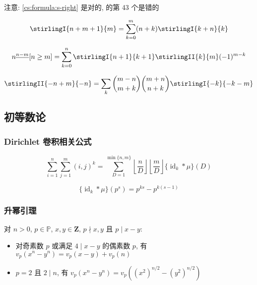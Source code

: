 注意: \eqref{cs:formula:s-right} 是对的,  的第 43 个是错的

\begin{equation}
    \label{cs:formula:s-right}
    \stirlingI{n+m+1}{m}=\sum_{k=0}^m(n+k)\stirlingI{k+n}{k}
\end{equation}

\begin{equation}
    n^{\underline{n-m}}[n\geq m]=\sum_{k=0}^n\stirlingI{n+1}{k+1}\stirlingII{k}{m}(-1)^{m-k}
\end{equation}

\begin{equation}
    \stirlingII{-n+m}{-n}=\sum_k\binom{m-n}{m+k}\binom{m+n}{n+k}\stirlingI{-k}{-k-m}
\end{equation}

\subsection{初等数论}

\subsubsection{Dirichlet 卷积相关公式}

\begin{equation}
    \sum_{i=1}^n\sum_{j=1}^m(i,j)^k=\sum_{D=1}^{\min\{n,m\}}\left\lfloor\frac{n}{D}\right\rfloor\left\lfloor\frac{m}{D}\right\rfloor\{\operatorname{id}_k*\mu\}(D)
\end{equation}

\begin{equation}
    \{\operatorname{id}_k*\mu\}(p^s)=p^{ks}-p^{k(s-1)}
\end{equation}

\subsubsection{升幂引理}

对 \(n>0\), \(p\in\mathbb{P}\), \(x,y\in\mathbf{Z}\), \(p\nmid x,y\) 且 \(p\mid x-y\):

\begin{itemize}
    \item 对奇素数 \(p\) 或满足 \(4\mid x-y\) 的偶素数 \(p\), 有 \(v_p\left(x^n-y^n\right)=v_p(x-y)+v_p(n)\)
    \item \(p=2\) 且 \(2\mid n\), 有 \(v_p\left(x^n-y^n\right)=v_p\left(\left(x^2\right)^{n/2}-\left(y^2\right)^{n/2}\right)\)
\end{itemize}

